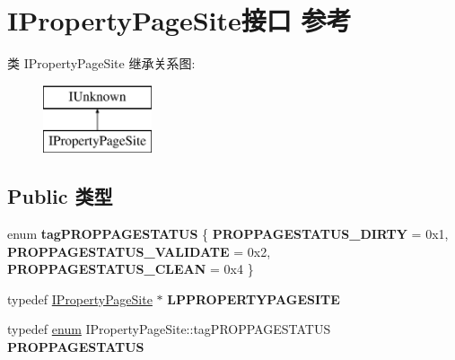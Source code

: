 \hypertarget{interface_i_property_page_site}{}\section{I\+Property\+Page\+Site接口 参考}
\label{interface_i_property_page_site}
类 I\+Property\+Page\+Site 继承关系图\+:\begin{figure}[H]
\begin{center}
\leavevmode
\includegraphics[height=2.000000cm]{interface_i_property_page_site}
\end{center}
\end{figure}
\subsection*{Public 类型}
\begin{DoxyCompactItemize}
\item 
\mbox{\label{interface_i_property_page_site_af362a82c367fbc560d5c361b99fb95b4}} 
enum {\bfseries tag\+P\+R\+O\+P\+P\+A\+G\+E\+S\+T\+A\+T\+US} \{ {\bfseries P\+R\+O\+P\+P\+A\+G\+E\+S\+T\+A\+T\+U\+S\+\_\+\+D\+I\+R\+TY} = 0x1, 
{\bfseries P\+R\+O\+P\+P\+A\+G\+E\+S\+T\+A\+T\+U\+S\+\_\+\+V\+A\+L\+I\+D\+A\+TE} = 0x2, 
{\bfseries P\+R\+O\+P\+P\+A\+G\+E\+S\+T\+A\+T\+U\+S\+\_\+\+C\+L\+E\+AN} = 0x4
 \}
\item 
\mbox{\label{interface_i_property_page_site_a72a93529b2758e9e287f2c26a2598a4f}} 
typedef \hyperlink{interface_i_property_page_site}{I\+Property\+Page\+Site} $\ast$ {\bfseries L\+P\+P\+R\+O\+P\+E\+R\+T\+Y\+P\+A\+G\+E\+S\+I\+TE}
\item 
\mbox{\label{interface_i_property_page_site_ac45eaec54318a94f4b2ba887f8479eaa}} 
typedef \hyperlink{interfaceenum}{enum} I\+Property\+Page\+Site\+::tag\+P\+R\+O\+P\+P\+A\+G\+E\+S\+T\+A\+T\+US {\bfseries P\+R\+O\+P\+P\+A\+G\+E\+S\+T\+A\+T\+US}
\end{DoxyCompactItemize}
